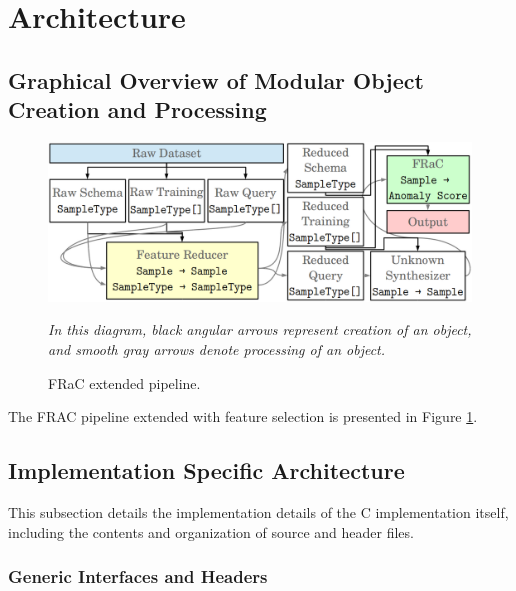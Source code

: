 \documentclass{article}
\newcommand{\CC}{C\nolinebreak\hspace{-.05em}\raisebox{.4ex}{\tiny\bf +}\nolinebreak\hspace{-.10em}\raisebox{.4ex}{\tiny\bf +}}
\begin{document}
\section{Architecture}

\label{sec:arch}

\begin{multicols}{2}

\subsection{Graphical Overview of Modular Object Creation and Processing}

\begin{figure}

\includegraphics[width=6.9in]{objects3}

\textit{In this diagram, black angular arrows represent creation of an object, and smooth gray arrows denote processing of an object.}

\caption{FRaC extended pipeline.}

\label{fig:pipeline}

\end{figure}

The FRAC pipeline extended with feature selection is presented in Figure \ref{fig:pipeline}.  

\subsection{Implementation Specific Architecture}

This subsection details the implementation details of the \CC{} implementation itself, including the contents and organization of source and header files.


\subsubsection{Generic Interfaces and Headers}


\end{multicols}
\end{document}
